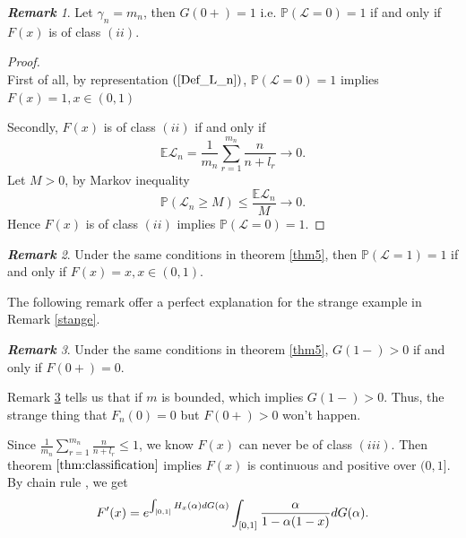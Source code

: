 \documentclass[12pt]{article}
\theoremstyle{plain}
\theoremstyle{definition}
\theoremstyle{remark}
\newtheorem{rem}{\textbf{Remark}}
\begin{document}
\begin{rem}
Let $\gamma_n=m_n$,  then $G(0+)=1$ i.e. $\mathbb{P}(\mathscr{L}=0)=1$ if and only if $F(x)$ is of class $(ii)$.
\end{rem}
\begin{proof}\ \\

    First of all, by representation $(\ref{Def_L_n})$, $\mathbb{P}(\mathscr{L}=0)=1$ implies $F(x)=1, x\in (0,1)$

    Secondly,
    $F(x)$ is of class $(ii)$ if and only if
    \begin{equation*}
        \mathbb{E}\mathscr{L}_n=\frac{1}{m_n} \sum_{r=1}^{m_n} \frac{n}{n+l_{r}} \rightarrow 0.
    \end{equation*}
    Let $M>0$, by Markov inequality
    \begin{equation*}
        \mathbb{P}(\mathscr{L}_n\geq M)\leq \frac{\mathbb{E}\mathscr{L}_n}{M} \rightarrow 0.
    \end{equation*}
    Hence $F(x)$ is of class $(ii)$ implies $\mathbb{P}(\mathscr{L}=0)=1$.
\end{proof}


\begin{rem}
Under the same conditions in theorem \ref{thm5}, then $\mathbb{P}(\mathscr{L}=1)=1$ if and only if $F(x)=x,x\in (0,1)$.\\
\end{rem}
The following remark offer a perfect explanation for the strange example in Remark \ref{stange}.
\begin{rem}\label{useless1}
    Under the same conditions in theorem \ref{thm5}, $G(1-)>0$ if and only if $F(0+)=0$. \\
\end{rem}
Remark \ref{useless1} tells us that if $m$ is bounded, which implies $G(1-)>0$. Thus, the strange thing that $F_n(0)=0$ but $F(0+)>0$ won't happen.

Since $\frac{1}{m_n} \sum_{r=1}^{m_n} \frac{n}{n+l_{r}}\leq 1$, we know $F(x)$ can never be of class $(iii)$. Then theorem $\ref{thm:classification}$  implies $F(x)$ is continuous and positive over $(0,1]$.\\
By chain rule%
, we get
\begin{equation}
F'(x)=e^{\int_{[0,1]}H_{x}(\alpha)dG(\alpha)}\int_{[0,1]}\dfrac{\alpha}{1-\alpha(1-x)}dG(\alpha).\\
\end{equation}
\end{document}
